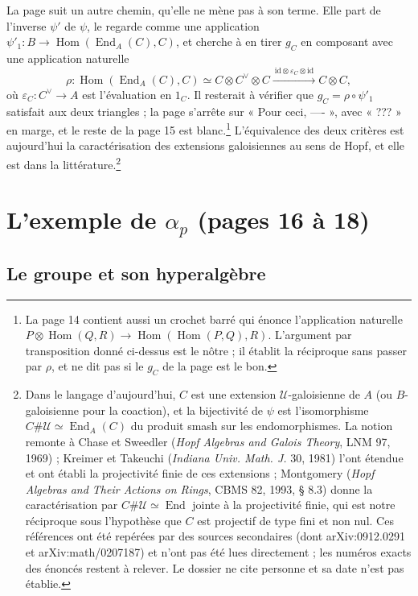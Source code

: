 \documentclass[11pt,a4paper]{article}
\begin{document}
La page suit un autre chemin, qu'elle ne mène pas à son terme. Elle part de
l'inverse $\psi'$ de $\psi$, le regarde comme une application
$\psi'_1 \colon B \to \operatorname{Hom}(\operatorname{End}_A(C), C)$, et
cherche à en tirer $g_C$ en composant avec une application naturelle
\[
\rho \colon \operatorname{Hom}(\operatorname{End}_A(C), C) \simeq C \otimes
C^{\vee} \otimes C \xrightarrow{\ \mathrm{id} \otimes \varepsilon_C \otimes
\mathrm{id}\ } C \otimes C,
\]
où $\varepsilon_C \colon C^{\vee} \to A$ est l'évaluation en $1_C$. Il
resterait à vérifier que $g_C = \rho \circ \psi'_1$ satisfait aux deux
triangles ; la page s'arrête sur « Pour ceci, ---- », avec « ??? » en marge,
et le reste de la page 15 est blanc.\footnote{La page 14 contient aussi un
crochet barré qui énonce l'application naturelle
$P \otimes \operatorname{Hom}(Q, R) \to
\operatorname{Hom}(\operatorname{Hom}(P, Q), R)$. L'argument par
transposition donné ci-dessus est le nôtre ; il établit la réciproque sans
passer par $\rho$, et ne dit pas si le $g_C$ de la page est le bon.}
L'équivalence des deux critères est aujourd'hui la caractérisation des
extensions galoisiennes au sens de Hopf, et elle est dans la
littérature.\footnote{Dans le langage d'aujourd'hui, $C$ est une extension
$\mathcal{U}$-galoisienne de $A$ (ou $B$-galoisienne pour la coaction), et la
bijectivité de $\psi$ est l'isomorphisme $C \# \mathcal{U} \simeq
\operatorname{End}_A(C)$ du produit smash sur les endomorphismes. La notion
remonte à Chase et Sweedler (\emph{Hopf Algebras and Galois Theory}, LNM 97,
1969) ; Kreimer et Takeuchi (\emph{Indiana Univ. Math. J.} 30, 1981) l'ont
étendue et ont établi la projectivité finie de ces extensions ; Montgomery
(\emph{Hopf Algebras and Their Actions on Rings}, CBMS 82, 1993, § 8.3) donne
la caractérisation par $C \# \mathcal{U} \simeq \operatorname{End}$ jointe à
la projectivité finie, qui est notre réciproque sous l'hypothèse que $C$ est
projectif de type fini et non nul. Ces références ont été repérées par des
sources secondaires (dont arXiv:0912.0291 et arXiv:math/0207187) et n'ont pas
été lues directement ; les numéros exacts des énoncés restent à relever. Le
dossier ne cite personne et sa date n'est pas établie.}

\section*{L'exemple de $\alpha_p$ (pages 16 à 18)}

\subsection*{Le groupe et son hyperalgèbre}
\end{document}

